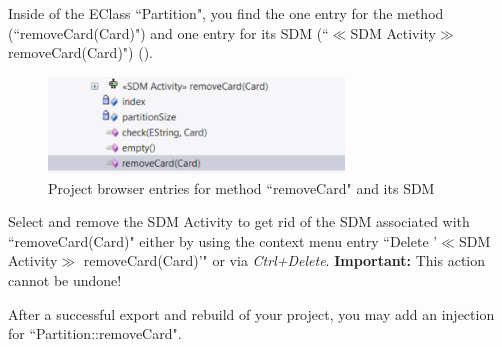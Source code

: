 \begin{stepbystep}
\item
Inside of the EClass ``Partition", you find the one entry for the method (``removeCard(Card)") and one entry for its SDM (``$\ll$SDM Activity$\gg$ removeCard(Card)") ().

\begin{figure}[htbp]
    \begin{center}
        \includegraphics[width=0.7\textwidth]{../../org.moflon.doc.handbook.03_storyDiagrams/03_removeCard/visRemImages/ea_sdmRemoveSDM_methodSelected}
        \caption{Project browser entries for method ``removeCard" and its SDM}  
        \label{ea:sdm_removeSDM_methodSelected}
    \end{center}
\end{figure}

\item
Select and remove the SDM Activity to get rid of the SDM associated with ``removeCard(Card)" either by using the context menu entry ``Delete '$\ll$SDM Activity$\gg$ removeCard(Card)'" or via \emph{Ctrl+Delete}.
\textbf{Important:} This action cannot be undone!

\item
After a successful export and rebuild of your project, you may add an injection for ``Partition::removeCard".

\end{stepbystep}